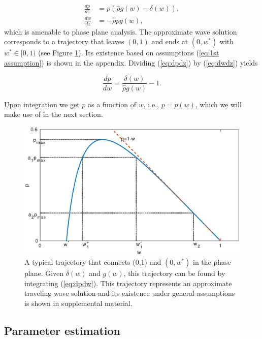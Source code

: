 \documentclass{aims}
\numberwithin{equation}{section}
\begin{document}
\begin{subequations}\label{eq:pp system}
\begin{align}
\frac{dp}{dz} & =p(\hat{\rho}g(w)-\delta(w)),\label{eq:dpdz}\\
\frac{dw}{dz} & =-\hat{\rho}pg(w),\label{eq:dwdz}
\end{align}
\end{subequations}which is amenable to phase plane analysis. The
approximate wave solution corresponds to a trajectory that leaves
$(0,1)$ and ends at $(0,w^{*})$ with $w^{*}\in[0,1)$ (see Figure
\ref{fig:pp}). Its existence based on assumptions (\ref{eq:1st assumption})
is shown in the appendix. Dividing (\ref{eq:dpdz}) by (\ref{eq:dwdz}) yields 

\begin{equation} \label{eq:dpdw}
\frac{dp}{dw}=\frac{\delta(w)}{\hat{\rho}g(w)}-1.
\end{equation}

Upon integration we get $p$ as a function of $w$, i.e., $p=p(w)$,
which we will make use of in the next section. 

\begin{figure}
\begin{center}
\includegraphics[scale=0.65]{plots/pp.eps}\caption{\label{fig:pp}A typical trajectory that connects (0,1) and $(0,w^*)$ in the phase plane. Given $\delta(w)$ and $g(w)$, this trajectory can be found by integrating (\ref{eq:dpdw}). This trajectory represents an approximate traveling wave solution and its existence under general assumptions is shown in supplemental material.}
\end{center}
\end{figure}

\subsection{Parameter estimation}
\end{document}
